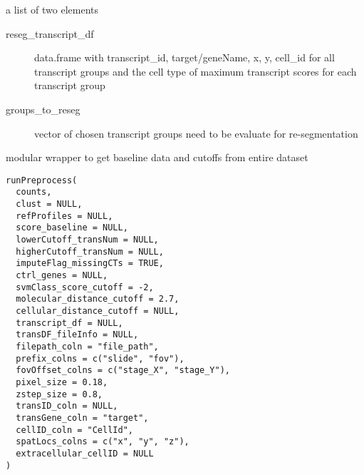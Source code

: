 \documentclass[letterpaper]{book}
\begin{document}
%
\begin{Value}
a list of two elements
\begin{description}

\item[reseg\_transcript\_df] data.frame with transcript\_id, target/geneName, x, y, cell\_id for all transcript groups  and the cell type of maximum transcript scores for each transcript group 
\item[groups\_to\_reseg] vector of chosen transcript groups need to be evaluate for re-segmentation

\end{description}

\end{Value}
%
\begin{Description}
modular wrapper to get baseline data and cutoffs from entire dataset
\end{Description}
%
\begin{Usage}
\begin{verbatim}
runPreprocess(
  counts,
  clust = NULL,
  refProfiles = NULL,
  score_baseline = NULL,
  lowerCutoff_transNum = NULL,
  higherCutoff_transNum = NULL,
  imputeFlag_missingCTs = TRUE,
  ctrl_genes = NULL,
  svmClass_score_cutoff = -2,
  molecular_distance_cutoff = 2.7,
  cellular_distance_cutoff = NULL,
  transcript_df = NULL,
  transDF_fileInfo = NULL,
  filepath_coln = "file_path",
  prefix_colns = c("slide", "fov"),
  fovOffset_colns = c("stage_X", "stage_Y"),
  pixel_size = 0.18,
  zstep_size = 0.8,
  transID_coln = NULL,
  transGene_coln = "target",
  cellID_coln = "CellId",
  spatLocs_colns = c("x", "y", "z"),
  extracellular_cellID = NULL
)
\end{verbatim}
\end{Usage}
%
\end{document}
